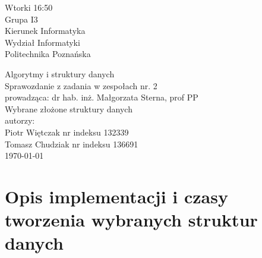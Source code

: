\documentclass[polish,polish,a4paper]{article}
\begin{document}
	
\begin{spacing}{1.5}
		\begin{titlepage}
			\begin{flushright}
				{ Wtorki 16:50\\
					Grupa I3\\
					Kierunek Informatyka\\
					Wydział Informatyki\\
					Politechnika Poznańska}
			\end{flushright}
		\vspace*{\fill}
		\begin{center}
			{\Large Algorytmy i struktury danych \\[0.1cm]
				Sprawozdanie z zadania w zespołach nr. 2\\[0.1cm]
				prowadząca: dr hab. inż. Małgorzata Sterna, prof PP}\\
			{\Huge Wybrane złożone struktury danych\\ [0.4cm]}
			{\large autorzy:\\[0.1cm]}
			{\large Piotr Więtczak nr indeksu 132339\\[0.1cm] Tomasz Chudziak nr indeksu 136691}\\[0.5cm]
			\today
		\end{center}
		\vspace*{\fill}
	\end{titlepage}

\section{Opis implementacji i czasy tworzenia wybranych struktur danych}

\begin{figure}[H]

\end{figure}
\end{spacing}
\end{document}
